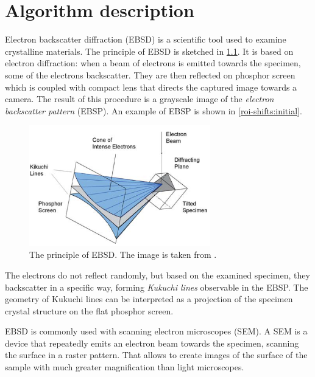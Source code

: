 \chapter{Algorithm description }

Electron backscatter diffraction (EBSD) is a scientific tool used to examine crystalline materials. The principle of EBSD is sketched in \cref{ebsd-principle}. It is based on electron diffraction: when a beam of electrons is emitted towards the specimen, some of the electrons backscatter. They are then reflected on phosphor screen which is coupled with compact lens that directs the captured image towards a camera. The result of this procedure is a grayscale image of the \emph{electron backscatter pattern} (EBSP). An example of EBSP is shown in \cref{roi-shifts:initial}.

\begin{figure}
	\centering
	\includegraphics[width=0.7\textwidth]{img/ebsd_principle}
	\caption{The principle of EBSD. The image is taken from \cite{schwartz2009electron}.}
	\label{ebsd-principle}
\end{figure}


The electrons do not reflect randomly, but based on the examined specimen, they backscatter in a specific way, forming \emph{Kukuchi lines} observable in the EBSP. The geometry of Kukuchi lines can be interpreted as a projection of the specimen crystal structure on the flat phosphor screen.

EBSD is commonly used with scanning electron microscopes (SEM). A SEM is a device that repeatedly emits an electron beam towards the specimen, scanning the surface in a raster pattern. That allows to create images of the surface of the sample with much greater magnification than light microscopes.

